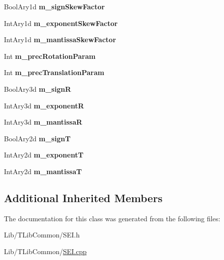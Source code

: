 \begin{DoxyCompactItemize}
\mbox{\label{class_s_e_i_multiview_acquisition_info_a42bfa4df3e4bcd4e232ac38d4e326ed5}} 
Bool\+Ary1d {\bfseries m\+\_\+sign\+Skew\+Factor}
\item 
\mbox{\label{class_s_e_i_multiview_acquisition_info_ae878bff41f69eb9b0ca27129892d73dc}} 
Int\+Ary1d {\bfseries m\+\_\+exponent\+Skew\+Factor}
\item 
\mbox{\label{class_s_e_i_multiview_acquisition_info_a540633bb57147653b40b592e8ac0aa3e}} 
Int\+Ary1d {\bfseries m\+\_\+mantissa\+Skew\+Factor}
\item 
\mbox{\label{class_s_e_i_multiview_acquisition_info_ae1b363bcc02396537e292ce6221ec7fd}} 
Int {\bfseries m\+\_\+prec\+Rotation\+Param}
\item 
\mbox{\label{class_s_e_i_multiview_acquisition_info_ae753aeb219d9074f9eb3f0064e29ca40}} 
Int {\bfseries m\+\_\+prec\+Translation\+Param}
\item 
\mbox{\label{class_s_e_i_multiview_acquisition_info_a630219d0824d061e0eb4559947192b1c}} 
Bool\+Ary3d {\bfseries m\+\_\+signR}
\item 
\mbox{\label{class_s_e_i_multiview_acquisition_info_a3f2b60bfc0cf41a5b11c702f32d05795}} 
Int\+Ary3d {\bfseries m\+\_\+exponentR}
\item 
\mbox{\label{class_s_e_i_multiview_acquisition_info_ae2ab835b6aed61ac05cce9eac3b445b6}} 
Int\+Ary3d {\bfseries m\+\_\+mantissaR}
\item 
\mbox{\label{class_s_e_i_multiview_acquisition_info_a190c254e9c78d0e424d49ac026a0faa7}} 
Bool\+Ary2d {\bfseries m\+\_\+signT}
\item 
\mbox{\label{class_s_e_i_multiview_acquisition_info_ad5d9e1a0cc1823ee4bcce05da9dd6571}} 
Int\+Ary2d {\bfseries m\+\_\+exponentT}
\item 
\mbox{\label{class_s_e_i_multiview_acquisition_info_a2685edde67bc1d50f2ea9479989e4749}} 
Int\+Ary2d {\bfseries m\+\_\+mantissaT}
\end{DoxyCompactItemize}
\subsection*{Additional Inherited Members}


The documentation for this class was generated from the following files\+:\begin{DoxyCompactItemize}
\item 
Lib/\+T\+Lib\+Common/S\+E\+I.\+h\item 
Lib/\+T\+Lib\+Common/\hyperlink{_s_e_i_8cpp}{S\+E\+I.\+cpp}\end{DoxyCompactItemize}
